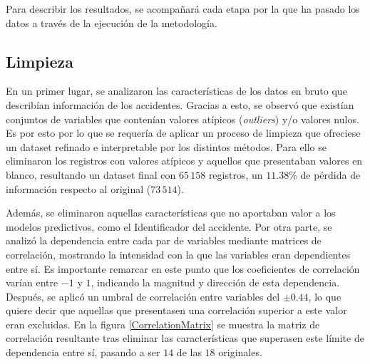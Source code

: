 Para describir los resultados, se acompañará cada etapa por la que ha pasado los datos a través de la ejecución de la metodología.

\subsection*{Limpieza}



En un primer lugar, se analizaron las características de los datos en bruto que describían información de los accidentes. Gracias a esto, se observó que existían conjuntos de variables que contenían valores atípicos (\textit{outliers}) y/o valores nulos. Es por esto por lo que se requería de aplicar un proceso de limpieza que ofreciese un dataset refinado e interpretable por los distintos métodos. Para ello se eliminaron los registros con valores atípicos y aquellos que presentaban valores en blanco, resultando un dataset final con $65\,158$ registros, un $11.38\%$ de pérdida de información respecto al original ($73\,514$).


Además, se eliminaron aquellas características que no aportaban valor a los modelos predictivos, como el Identificador del accidente. Por otra parte, se analizó la dependencia entre cada par de variables mediante matrices de correlación, mostrando la intensidad con la que las variables eran dependientes entre sí. Es importante remarcar en este punto que los coeficientes de correlación varían entre $-1$ y $1$, indicando la magnitud y dirección de esta dependencia. Después, se aplicó un umbral de correlación entre variables del $\pm 0.44$, lo que quiere decir que aquellas que presentasen una correlación superior a este valor eran excluidas. En la figura \ref{CorrelationMatrix} se muestra la matriz de correlación resultante tras eliminar las características que superasen este límite de dependencia entre sí, pasando a ser $14$ de las $18$ originales.

